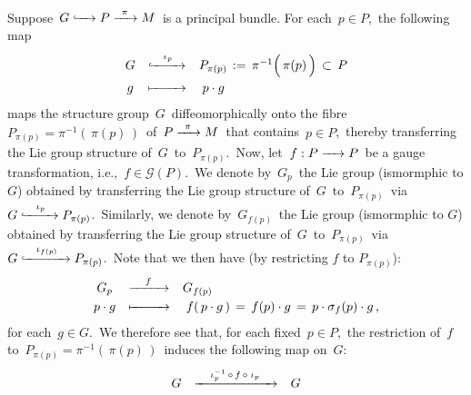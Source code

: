 \vskip 0.5cm
\begin{remark}
\mbox{}
\vskip 0.1cm
\noindent
Suppose
\,$G \xhookrightarrow{{\color{white}222}} P \xrightarrow{{\color{white}2}\pi{\color{white}2}} M$\,
is a principal bundle.
For each \,$p \in P$,\, the following map
\begin{equation*}
\begin{array}{ccl}
G
&
\xhookrightarrow{{\color{white}22}\iota_{p}{\color{white}22}}
&
P_{\pi(p)} \,:=\, \pi^{-1}\!\left(\,\overset{{\color{white}.}}{\pi(p)}\,\right) \,\subset\, P
\\
g
&
\xmapsto{{\color{white}222222}}
&
{\color{white}.}p \cdot g
\end{array}
\end{equation*}
maps the structure group \,$G$\, diffeomorphically onto the fibre
\,$P_{\pi(p)} = \pi^{-1}(\,\pi(p)\,)$\,
of
\,$P \xrightarrow{{\color{white}2}\pi{\color{white}2}} M$\,
that contains \,$p \in P$,\,
thereby transferring the Lie group structure of \,$G$\, to \,$P_{\pi(p)}$.\,
Now, let \,$f : P \xrightarrow{{\color{white}222}} P$\, be a gauge transformation,
i.e., \,$f \in \mathscr{G}(P)$.\,
We denote by \,$G_{p}$\, the Lie group (ismormphic to $G$) obtained by transferring the Lie group structure
of \,$G$\, to \,$P_{\pi(p)}$\, via
\,$G \xhookrightarrow{{\color{white}22}\iota_{p}{\color{white}22}}P_{\pi(p)}$.\,
Similarly, we denote by \,$G_{f(p)}$\, the Lie group (ismormphic to $G$)
obtained by transferring the Lie group structure of \,$G$\, to \,$P_{\pi(p)}$\, via
\,$G \xhookrightarrow{{\color{white}22}\iota_{f(p)}{\color{white}22}}P_{\pi(p)}$.\,
Note that we then have (by restricting $f$ to $P_{\pi(p)}$):
\begin{equation*}
\begin{array}{ccl}
G_{p}
&
\xrightarrow{{\color{white}22.}f{\color{white}.22}}
&
G_{f(p)}
\\
p \cdot g
&
\xmapsto{{\color{white}222.222}}
&
{\color{white}.} f(\,p \cdot g\,) \,=\, f(p) \cdot g \,=\, p \cdot \sigma_{f}(p) \cdot g\,,
\end{array}
\end{equation*}
for each \,$g \in G$.\,
We therefore see that, for each fixed \,$p \in P$,\,
the restriction of \,$f$\, to \,$P_{\pi(p)} = \pi^{-1}(\,\pi(p)\,)$\,
induces the following map on \,$G$:\,
\begin{equation*}
\begin{array}{ccl}
G
&
\xrightarrow{{\color{white}22.}\iota_{p}^{-1}\,\circ\,f\,\circ\;\iota_{p}{\color{white}.22}}
&
G
\\

\end{array}
\end{equation*}
\end{remark}
